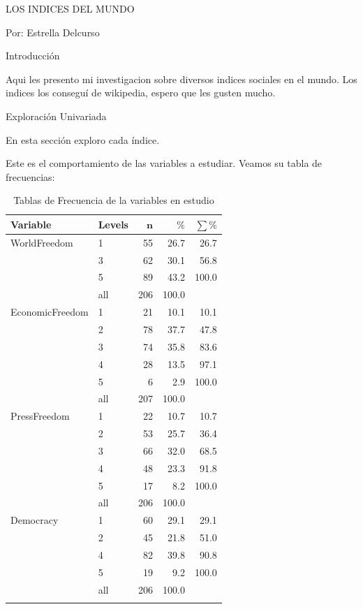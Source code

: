 \documentclass{article}
\begin{document}


LOS INDICES DEL MUNDO


Por: Estrella Delcurso


Introducción

Aqui les presento mi investigacion sobre diversos indices sociales en el mundo. Los indices los conseguí de wikipedia, espero que les gusten mucho.


Exploración Univariada

En esta sección exploro cada índice.




Este es el comportamiento de las variables a estudiar. Veamos su tabla de frecuencias:

\begingroup\footnotesize
\begin{longtable}{llrrr}
\caption{Tablas de Frecuencia de la variables en estudio} \\ 
 \textbf{Variable} & \textbf{Levels} & $\mathbf{n}$ & $\mathbf{\%}$ & $\mathbf{\sum \%}$ \\ 
  \hline \hline
WorldFreedom & 1 & 55 & 26.7 & 26.7 \\ 
   & 3 & 62 & 30.1 & 56.8 \\ 
   & 5 & 89 & 43.2 & 100.0 \\ 
   \hline
 & all & 206 & 100.0 &  \\ 
   \hline
\hline
EconomicFreedom & 1 & 21 & 10.1 & 10.1 \\ 
   & 2 & 78 & 37.7 & 47.8 \\ 
   & 3 & 74 & 35.8 & 83.6 \\ 
   & 4 & 28 & 13.5 & 97.1 \\ 
   & 5 & 6 & 2.9 & 100.0 \\ 
   \hline
 & all & 207 & 100.0 &  \\ 
   \hline
\hline
PressFreedom & 1 & 22 & 10.7 & 10.7 \\ 
   & 2 & 53 & 25.7 & 36.4 \\ 
   & 3 & 66 & 32.0 & 68.5 \\ 
   & 4 & 48 & 23.3 & 91.8 \\ 
   & 5 & 17 & 8.2 & 100.0 \\ 
   \hline
 & all & 206 & 100.0 &  \\ 
   \hline
\hline
Democracy & 1 & 60 & 29.1 & 29.1 \\ 
   & 2 & 45 & 21.8 & 51.0 \\ 
   & 4 & 82 & 39.8 & 90.8 \\ 
   & 5 & 19 & 9.2 & 100.0 \\ 
   \hline
 & all & 206 & 100.0 &  \\ 
   \hline
\hline
\hline
\label{}
\end{longtable}
\endgroup
\end{document}
